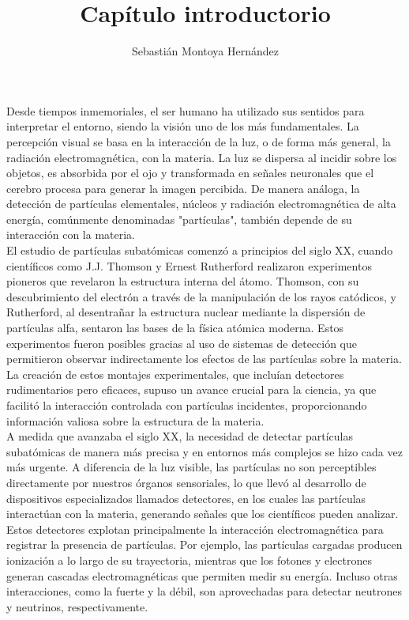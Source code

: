 \documentclass{article}
\title{\textbf{Capítulo introductorio}}
\author{Sebastián Montoya Hernández}
\begin{document}
\maketitle 
\setcounter{section}{0}

\noindent Desde tiempos inmemoriales, el ser humano ha utilizado sus sentidos para interpretar el entorno, siendo la visión uno de los más fundamentales. La percepción visual se basa en la interacción de la luz, o de forma más general, la radiación electromagnética, con la materia. La luz se dispersa al incidir sobre los objetos, es absorbida por el ojo y transformada en señales neuronales que el cerebro procesa para generar la imagen percibida. De manera análoga, la detección de partículas elementales, núcleos y radiación electromagnética de alta energía, comúnmente denominadas "partículas", también depende de su interacción con la materia. \\

\noindent El estudio de partículas subatómicas comenzó a principios del siglo XX, cuando científicos como J.J. Thomson y Ernest Rutherford realizaron experimentos pioneros que revelaron la estructura interna del átomo. Thomson, con su descubrimiento del electrón a través de la manipulación de los rayos catódicos, y Rutherford, al desentrañar la estructura nuclear mediante la dispersión de partículas alfa, sentaron las bases de la física atómica moderna. Estos experimentos fueron posibles gracias al uso de sistemas de detección que permitieron observar indirectamente los efectos de las partículas sobre la materia. La creación de estos montajes experimentales, que incluían detectores rudimentarios pero eficaces, supuso un avance crucial para la ciencia, ya que facilitó la interacción controlada con partículas incidentes, proporcionando información valiosa sobre la estructura de la materia. \\

\noindent A medida que avanzaba el siglo XX, la necesidad de detectar partículas subatómicas de manera más precisa y en entornos más complejos se hizo cada vez más urgente. A diferencia de la luz visible, las partículas no son perceptibles directamente por nuestros órganos sensoriales, lo que llevó al desarrollo de dispositivos especializados llamados detectores, en los cuales las partículas interactúan con la materia, generando señales que los científicos pueden analizar. Estos detectores explotan principalmente la interacción electromagnética para registrar la presencia de partículas. Por ejemplo, las partículas cargadas producen ionización a lo largo de su trayectoria, mientras que los fotones y electrones generan cascadas electromagnéticas que permiten medir su energía. Incluso otras interacciones, como la fuerte y la débil, son aprovechadas para detectar neutrones y neutrinos, respectivamente. \\
\end{document}
